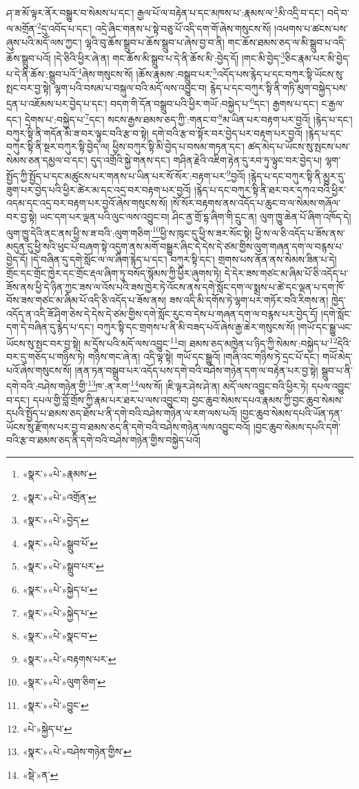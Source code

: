 ཤ་ཟ་མོ་ལྟར་ནོར་བསྒྱུར་བ་སེམས་པ་དང་། རྒྱལ་པོ་ལ་བརྟེན་པ་དང་མཁས་པ་:རྣམས་ལ་\footnote{«སྣར་»«པེ་»རྣམས་}མི་འདྲི་བ་དང་། བདེ་བ་ལ་མགྲོན་\footnote{«སྣར་»«པེ་»འགྲོན་}དུ་འབོད་པ་དང་། འདྲེ་ཞིང་གནས་པ་སྟེ་བཅུ་པོ་འདི་དག་གོ་ཞེས་གསུངས་སོ། །འཕགས་པ་ཚངས་པས་ཞུས་པའི་མདོ་ལས་ཀྱང་། ལྷའི་བུ་ཆོས་སྒྲུབ་པ་ཆོས་སྒྲུབ་པ་ཞེས་བྱ་བ་ནི། གང་ཆོས་ཐམས་ཅད་ལ་མི་སྒྲུབ་པ་འདི་ཆོས་སྒྲུབ་པའོ། །དེ་ཅིའི་ཕྱིར་ཞེ་ན། གང་ཆོས་མི་སྒྲུབ་པ་དེ་ནི་ཆོས་མི་:བྱེད་དོ། །གང་མི་བྱེད་\footnote{«སྣར་»«པེ་»བྱེད་}ཅིང་རྣམ་པར་མི་བྱེད་པ་དེ་ནི་ཆོས་:སྒྲུབ་པའོ་\footnote{«སྣར་»«པེ་»སྒྲུབ་པོ་}ཞེས་གསུངས་སོ། །ཆོས་རྣམས་:བསྒྲུབ་པར་\footnote{«སྣར་»«པེ་»སྒྲུབ་པར་}འདོད་པས་རྙེད་པ་དང་བཀུར་སྟི་ཡོངས་སུ་སྤང་བར་བྱ་སྟེ། ལྷག་པའི་བསམ་པ་བསྐུལ་བའི་མདོ་ལས་འབྱུང་བ། རྙེད་པ་དང་བཀུར་སྟི་ནི་གཏི་མུག་བསྐྱེད་པས་དྲན་པ་འཇོམས་པར་བྱེད་པ་དང་། བདག་གི་དོན་བསྒྲུབ་པའི་ཕྱིར་གཡོ་:བསྐྱེད་པ་\footnote{«སྣར་»«པེ་»སྐྱེད་པ་}དང་། རྒྱགས་པ་དང་། ང་རྒྱལ་དང་། དྲེགས་པ་:བསྐྱེད་པ་\footnote{«སྣར་»«པེ་»སྐྱེད་པ་}དང་། སངས་རྒྱས་ཐམས་ཅད་ཀྱི་:གནང་བ་\footnote{«སྣར་»«པེ་»སྣང་བ་}མ་ཡིན་པར་བརྟག་པར་བྱའོ། །རྙེད་པ་དང་། བཀུར་སྟི་ནི་གདོན་མི་ཟ་བར་ལྟུང་བའི་རྩ་བ་སྟེ། དགེ་བའི་རྩ་བ་སྟོར་བར་བྱེད་པར་བརྟག་པར་བྱའོ། །རྙེད་པ་དང་བཀུར་སྟི་ནི་སྔར་བཀུར་སྟི་བྱེད་ལ། ཕྱིས་བཀུར་སྟི་མི་བྱེད་པ་བསམ་གཏན་དང་། ཚད་མེད་པ་ཡོངས་སུ་སྤངས་པས་སེམས་ཅན་དམྱལ་བ་དང་། དུད་འགྲོའི་སྐྱེ་གནས་དང་། གཤིན་རྗེའི་འཇིག་རྟེན་དུ་རབ་ཏུ་ལྟུང་བར་བྱེད་པ། ལྷག་སྤྱོད་ཀྱི་སྤྱོད་པ་དང་མཚུངས་པར་གནས་པ་ཡིན་པར་སོ་སོར་:བརྟག་པར་\footnote{«སྣར་»«པེ་»བརྟགས་པར་}བྱའོ། །རྙེད་པ་དང་བཀུར་སྟི་ནི་མྱུར་དུ་ཟུག་པར་བྱེད་པའི་ཕྱིར་ཚེར་མ་དང་འདྲ་བར་བརྟག་པར་བྱའོ། །རྙེད་པ་དང་བཀུར་སྟི་ནི་ཐར་བར་དཀའ་བའི་ཕྱིར་འདམ་དང་འདྲ་བར་བརྟག་པར་བྱའོ་ཞེས་གསུངས་སོ། །སོ་སོར་བརྟགས་ནས་འདོད་པ་ཆུང་བ་ལ་སེམས་གཞོལ་བར་བྱ་སྟེ། ཡང་དག་པར་ལྡན་པའི་ལུང་ལས་འབྱུང་བ། ཤིང་ནྱ་གྲོ་དྷ་ཞིག་གི་དྲུང་ན། ལུག་ཁྱུ་ཆེན་པོ་ཞིག་འཁོད་དེ། ལུག་ཁྱུ་དེའི་ནང་ནས་ཕྱི་ས་ཟ་བའི་:ལུག་གཅིག་\footnote{«སྣར་»«པེ་»ལུག་ཅིག་}ཕྱི་ས་ཁུང་དུ་ཕྱི་ས་ཟར་སོང་སྟེ། ཕྱི་ས་ལ་ཅི་འདོད་པ་ཟོས་ནས་མདུན་དུ་ཕྱི་སའི་ཕུང་པོ་བཞག་སྟེ་འདུག་ནས་མགོ་བསྒྱུར་ཞིང་དེ་དེས་དེ་ཙམ་གྱིས་ལུག་གཞན་དག་ལ་བརྙས་པ་བྱེད་དོ། །དེ་བཞིན་དུ་དགེ་སློང་ལ་ལ་ཞིག་རྙེད་པ་དང་། བཀུར་སྟི་དང་། གྲགས་པས་ནོན་ནས་སེམས་ཟིན་པ་དེ། གྲོང་དང་གྲོང་ཁྱེར་དང་གྲོང་རྡལ་ཞིག་ཏུ་བསོད་སྙོམས་ཀྱི་ཕྱིར་ཞུགས་ཏེ། དེ་དེར་ཟས་གཙང་མ་ཞིམ་པོ་ཅི་འདོད་པ་ཟོས་ནས་ཕྱི་དེ་ཉིན་ཀྱང་ཟས་ལ་འོས་པའི་ཟས་ཁྱེར་ཏེ་འོངས་ནས་དགེ་སློང་དག་ལ་སྨྲས་པ་ཚེ་དང་ལྡན་པ་དག་ཁོ་བོས་ཟས་གཙང་མ་ཞིམ་པོ་འདི་ཅི་འདོད་པ་ཟོས་ནས། ཟས་འདི་མི་དགོས་ཏེ་ལྷག་པར་གཏོར་བའི་རིགས་ན། ཁྱེད་འདོད་ན་འདི་ཟོ་ཤིག་ཅེས་དེ་དེས་དེ་ཙམ་གྱིས་དགེ་སློང་རུང་བ་དེས་པ་གཞན་དག་ལ་བརྙས་པར་བྱེད་དོ། །དགེ་སློང་དག་དེ་བཞིན་དུ་རྙེད་པ་དང་། བཀུར་སྟི་དང་གྲགས་པ་ནི་མི་བཟད་པའོ་ཞེས་རྒྱ་ཆེར་གསུངས་སོ། །གཡོ་དང་སྒྱུ་ཡང་ཡོངས་སུ་སྤང་བར་བྱ་སྟེ། མ་དྲོས་པའི་མདོ་ལས་འབྱུང་\footnote{«སྣར་»«པེ་»བྱུང་}བ། ཐམས་ཅད་མཁྱེན་པ་ཉིད་ཀྱི་སེམས་:བསྐྱེད་པ་\footnote{«པེ་»སྐྱེད་པ་}དེའི་བར་དུ་གཅོད་པ་གཉིས་ཏེ། གཉིས་གང་ཞེ་ན། འདི་ལྟ་སྟེ། གཡོ་དང་སྒྱུའོ། །གཞི་འང་གཉིས་ཏེ་དྲང་པོ་དང་། གཡོ་མེད་པའོ་ཞེས་གསུངས་སོ། །ནན་ཏན་བསྒྲུབ་པར་འདོད་པས་དགེ་བའི་བཤེས་གཉེན་དག་ལ་བརྟེན་པར་བྱ་སྟེ། སྒྲུབ་པ་ནི་དགེ་བའི་:བཤེས་གཉེན་གྱི་\footnote{«སྣར་»«པེ་»བཤེས་གཉེན་གྱིས་}ཁ་:ན་རག་\footnote{«སྡེ་»ན་}ལས་སོ། །ཇི་ལྟར་ཤེས་ཤེ་ན། མདོ་ལས་འབྱུང་བའི་ཕྱིར་ཏེ། དཔལ་འབྱུང་བ་དང་། དཔལ་གྱི་བློ་གྲོས་ཀྱི་རྣམ་པར་ཐར་པ་ལས་འབྱུང་བ། བྱང་ཆུབ་སེམས་དཔའ་རྣམས་ཀྱི་བྱང་ཆུབ་སེམས་དཔའི་སྤྱོད་པ་ཐམས་ཅད་ཐོས་པ་ནི་དགེ་བའི་བཤེས་གཉེན་ལ་རག་ལས་པའོ། །བྱང་ཆུབ་སེམས་དཔའི་ཡོན་ཏན་ཡོངས་སུ་རྫོགས་པར་བྱ་བ་ཐམས་ཅད་ནི་དགེ་བའི་བཤེས་གཉེན་ལས་འབྱུང་བའོ། །བྱང་ཆུབ་སེམས་དཔའི་དགེ་བའི་རྩ་བ་ཐམས་ཅད་ནི་དགེ་བའི་བཤེས་གཉེན་གྱིས་བསྐྱེད་པའོ། 